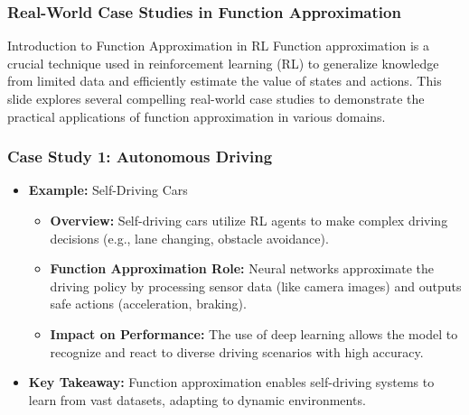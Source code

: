 \documentclass[aspectratio=169]{beamer}
\begin{document}
\begin{frame}[fragile]
    \frametitle{Real-World Case Studies in Function Approximation}
    \begin{block}{Introduction to Function Approximation in RL}
        Function approximation is a crucial technique used in reinforcement learning (RL) to generalize knowledge from limited data and efficiently estimate the value of states and actions. This slide explores several compelling real-world case studies to demonstrate the practical applications of function approximation in various domains.
    \end{block}
\end{frame}

\begin{frame}[fragile]
    \frametitle{Case Study 1: Autonomous Driving}
    \begin{itemize}
        \item \textbf{Example:} Self-Driving Cars
        \begin{itemize}
            \item \textbf{Overview:} Self-driving cars utilize RL agents to make complex driving decisions (e.g., lane changing, obstacle avoidance).
            \item \textbf{Function Approximation Role:} Neural networks approximate the driving policy by processing sensor data (like camera images) and outputs safe actions (acceleration, braking).
            \item \textbf{Impact on Performance:} The use of deep learning allows the model to recognize and react to diverse driving scenarios with high accuracy.
        \end{itemize}
        \item \textbf{Key Takeaway:} Function approximation enables self-driving systems to learn from vast datasets, adapting to dynamic environments.
    \end{itemize}
\end{frame}
\end{document}
